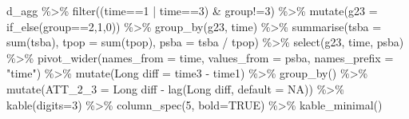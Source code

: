 \documentclass[
]{article}
\newenvironment{Shaded}{\begin{snugshade}}{\end{snugshade}}
\newcommand{\AttributeTok}[1]{\textcolor[rgb]{0.77,0.63,0.00}{#1}}
\newcommand{\ConstantTok}[1]{\textcolor[rgb]{0.00,0.00,0.00}{#1}}
\newcommand{\DecValTok}[1]{\textcolor[rgb]{0.00,0.00,0.81}{#1}}
\newcommand{\FunctionTok}[1]{\textcolor[rgb]{0.00,0.00,0.00}{#1}}
\newcommand{\NormalTok}[1]{#1}
\newcommand{\OtherTok}[1]{\textcolor[rgb]{0.56,0.35,0.01}{#1}}
\newcommand{\SpecialCharTok}[1]{\textcolor[rgb]{0.00,0.00,0.00}{#1}}
\newcommand{\StringTok}[1]{\textcolor[rgb]{0.31,0.60,0.02}{#1}}
\begin{document}
\begin{Shaded}
\begin{Highlighting}[]
\NormalTok{d\_agg }\SpecialCharTok{\%\textgreater{}\%} \FunctionTok{filter}\NormalTok{((time}\SpecialCharTok{==}\DecValTok{1} \SpecialCharTok{|}\NormalTok{ time}\SpecialCharTok{==}\DecValTok{3}\NormalTok{) }\SpecialCharTok{\&}\NormalTok{ group}\SpecialCharTok{!=}\DecValTok{3}\NormalTok{) }\SpecialCharTok{\%\textgreater{}\%}
  \FunctionTok{mutate}\NormalTok{(}\AttributeTok{g23 =} \FunctionTok{if\_else}\NormalTok{(group}\SpecialCharTok{==}\DecValTok{2}\NormalTok{,}\DecValTok{1}\NormalTok{,}\DecValTok{0}\NormalTok{)) }\SpecialCharTok{\%\textgreater{}\%}
  \FunctionTok{group\_by}\NormalTok{(g23, time) }\SpecialCharTok{\%\textgreater{}\%}
  \FunctionTok{summarise}\NormalTok{(}\AttributeTok{tsba =} \FunctionTok{sum}\NormalTok{(tsba),}
            \AttributeTok{tpop =} \FunctionTok{sum}\NormalTok{(tpop),}
            \AttributeTok{psba =}\NormalTok{ tsba }\SpecialCharTok{/}\NormalTok{ tpop) }\SpecialCharTok{\%\textgreater{}\%}
  \FunctionTok{select}\NormalTok{(g23, time, psba) }\SpecialCharTok{\%\textgreater{}\%}
  \FunctionTok{pivot\_wider}\NormalTok{(}\AttributeTok{names\_from =}\NormalTok{ time, }\AttributeTok{values\_from =}\NormalTok{ psba,}
              \AttributeTok{names\_prefix =} \StringTok{"time"}\NormalTok{) }\SpecialCharTok{\%\textgreater{}\%}
  \FunctionTok{mutate}\NormalTok{(}\StringTok{\textasciigrave{}}\AttributeTok{Long diff}\StringTok{\textasciigrave{}} \OtherTok{=} \StringTok{\textasciigrave{}}\AttributeTok{time3}\StringTok{\textasciigrave{}} \SpecialCharTok{{-}} \StringTok{\textasciigrave{}}\AttributeTok{time1}\StringTok{\textasciigrave{}}\NormalTok{) }\SpecialCharTok{\%\textgreater{}\%}
  \FunctionTok{group\_by}\NormalTok{() }\SpecialCharTok{\%\textgreater{}\%}
  \FunctionTok{mutate}\NormalTok{(}\AttributeTok{ATT\_2\_3 =} \StringTok{\textasciigrave{}}\AttributeTok{Long diff}\StringTok{\textasciigrave{}} \SpecialCharTok{{-}} \FunctionTok{lag}\NormalTok{(}\StringTok{\textasciigrave{}}\AttributeTok{Long diff}\StringTok{\textasciigrave{}}\NormalTok{, }\AttributeTok{default =} \ConstantTok{NA}\NormalTok{)) }\SpecialCharTok{\%\textgreater{}\%}
  \FunctionTok{kable}\NormalTok{(}\AttributeTok{digits=}\DecValTok{3}\NormalTok{) }\SpecialCharTok{\%\textgreater{}\%}
  \FunctionTok{column\_spec}\NormalTok{(}\DecValTok{5}\NormalTok{, }\AttributeTok{bold=}\ConstantTok{TRUE}\NormalTok{) }\SpecialCharTok{\%\textgreater{}\%}
  \FunctionTok{kable\_minimal}\NormalTok{()}
\end{Highlighting}
\end{Shaded}
\end{document}

